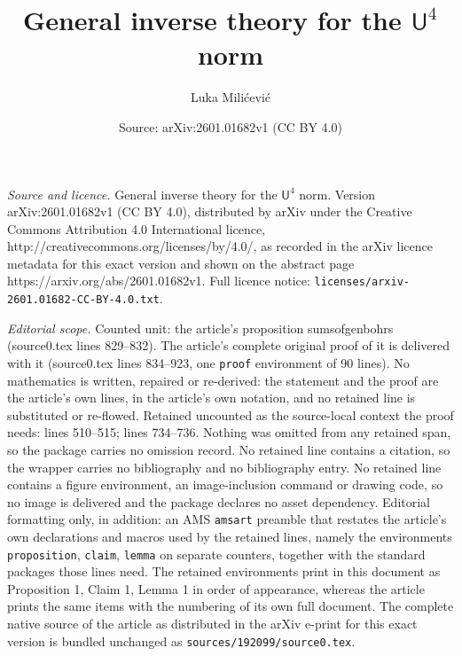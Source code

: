 \documentclass[10pt,a4paper]{amsart}
\title{General inverse theory for the $\mathsf{U}^4$ norm}
\author{Luka Mili\'cevi\'c}
\date{Source: arXiv:2601.01682v1 (CC BY 4.0)}
\begin{document}
\maketitle

\noindent\emph{Source and licence.} General inverse theory for the $\mathsf{U}^4$ norm. Version arXiv:2601.01682v1 (CC BY 4.0), distributed by arXiv under the Creative Commons Attribution 4.0 International licence, http://creativecommons.org/licenses/by/4.0/, as recorded in the arXiv licence metadata for this exact version and shown on the abstract page https://arxiv.org/abs/2601.01682v1. Full licence notice: \texttt{licenses/arxiv-2601.01682-CC-BY-4.0.txt}.\par\smallskip

\noindent\textit{Editorial scope.} Counted unit: the article's proposition sumsofgenbohrs (source0.tex lines 829--832). The article's complete original proof of it is delivered with it (source0.tex lines 834--923, one \texttt{proof} environment of 90 lines). No mathematics is written, repaired or re-derived: the statement and the proof are the article's own lines, in the article's own notation, and no retained line is substituted or re-flowed.  Retained uncounted as the source-local context the proof needs: lines 510--515; lines 734--736.  Nothing was omitted from any retained span, so the package carries no omission record.  No retained line contains a citation, so the wrapper carries no bibliography and no bibliography entry.  No retained line contains a figure environment, an image-inclusion command or drawing code, so no image is delivered and the package declares no asset dependency.  Editorial formatting only, in addition: an AMS \texttt{amsart} preamble that restates the article's own declarations and macros used by the retained lines, namely the environments \texttt{proposition}, \texttt{claim}, \texttt{lemma} on separate counters, together with the standard packages those lines need.  The retained environments print in this document as Proposition 1, Claim 1, Lemma 1 in order of appearance, whereas the article prints the same items with the numbering of its own full document.  The complete native source of the article as distributed in the arXiv e-print for this exact version is bundled unchanged as \texttt{sources/192099/source0.tex}.
\end{document}
